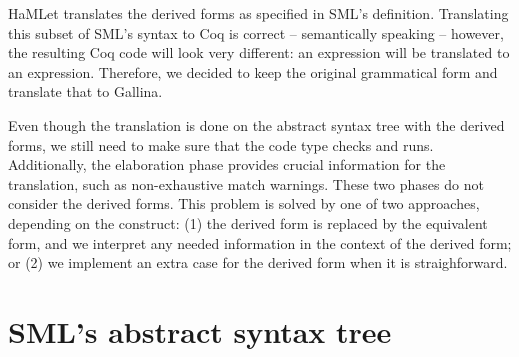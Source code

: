 \documentclass[a4paper,11pt]{article}
\begin{document}
HaMLet translates the derived forms as specified in SML's definition.
Translating this subset of SML's syntax to Coq is correct -- semantically
speaking -- however, the resulting Coq code will look very different: an
 expression will be translated to an 
expression. Therefore, we decided to keep the original grammatical form and
translate that to Gallina.

Even though the translation is done on the abstract syntax tree with the derived
forms, we still need to make sure that the code type checks and runs.
Additionally, the elaboration phase provides crucial information for the
translation, such as non-exhaustive match warnings. These two phases do not
consider the derived forms. This problem is solved by one of two approaches,
depending on the construct: (1) the derived form is replaced by the equivalent
form, and we interpret any needed information in the context of the derived
form; or (2) we implement an extra case for the derived form when it is
straighforward.


\section{SML's abstract syntax tree}
\end{document}
